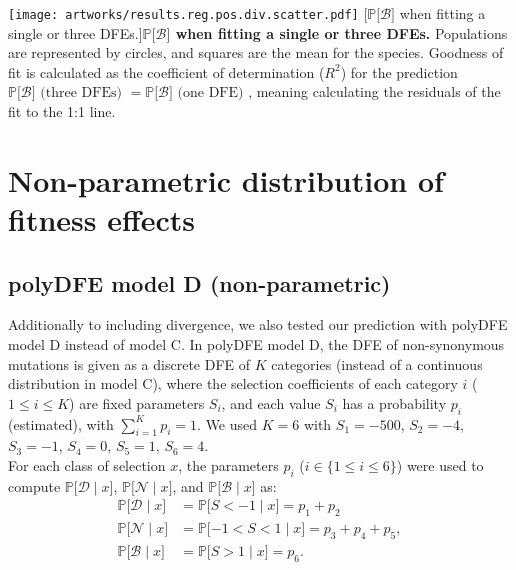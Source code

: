 \documentclass{article}
\newcommand{\proba}{\mathbb{P}}
\newcommand{\Sphyclass}{x}
\newcommand{\given}{\mid}
\newcommand{\Spop}{S}
\newcommand{\SpopDel}{\mathcal{D}}
\newcommand{\SpopNeu}{\mathcal{N}}
\newcommand{\SpopBen}{\mathcal{B}}
\begin{document}
    \begin{center}
        \texttt{[image: artworks/results.reg.pos.div.scatter.pdf]}
        [$\proba{[} \SpopBen {]}$ when fitting a single or three DFEs.]{\textbf{$\bm{\proba{[} \SpopBen {]}}$ when fitting a single or three DFEs.} Populations are represented by circles, and squares are the mean for the species. Goodness of fit is calculated as the coefficient of determination ($R^2$) for the prediction $\proba{[} \SpopBen ] \text{ (three DFEs) } = \proba{[} \SpopBen ] \text{ (one DFE) }$, meaning calculating the residuals of the fit to the 1:1 line.\label{fig:one-three-pos}}
    \end{center}

    \newpage

    \section{Non-parametric distribution of fitness effects}

    \subsection{polyDFE model D (non-parametric)}
    Additionally to including divergence, we also tested our prediction with polyDFE model D instead of model C.
    In polyDFE model D, the DFE of non-synonymous mutations is given as a discrete DFE of $K$ categories (instead of a continuous distribution in model C), where the selection coefficients of each category $i$ ($1 \leq i \leq K$) are fixed parameters $\Spop_i$, and each value $\Spop_i$ has a probability $p_i$ (estimated), with $\sum_{i=1}^{K} p_i =1$.
    We used $K=6$ with $\Spop_1 = -500$, $\Spop_2 = -4$, $\Spop_3 =-1$, $\Spop_4 = 0$, $\Spop_5 = 1$, $\Spop_6 = 4$.\\

    For each class of selection $\Sphyclass$, the parameters $p_i$ ($i \in \{ 1 \leq i \leq 6 \}$) were used to compute $\proba{[} \SpopDel \given  \Sphyclass{]}$, $\proba{[} \SpopNeu \given \Sphyclass{]}$, and $\proba{[} \SpopBen \given \Sphyclass{]}$ as:
    \begin{align}
        \proba{[} \SpopDel \given  \Sphyclass] &= \proba{[} \Spop < -1 \given \Sphyclass ] = p_1 + p_2 \label{eq:polyProbaDel-mD} \\
        \proba{[} \SpopNeu \given \Sphyclass] &= \proba{[} -1 < \Spop < 1 \given \Sphyclass ] = p_3 + p_4 + p_5,  \\
        \proba{[} \SpopBen \given \Sphyclass] &= \proba{[}  \Spop > 1 \given \Sphyclass ] = p_6.  \label{eq:polyProbaAdv-mD}
    \end{align}
\end{document}
